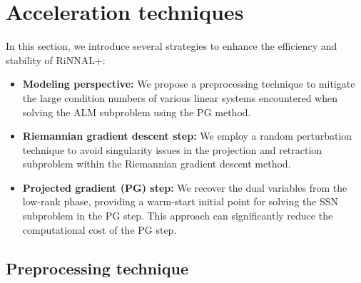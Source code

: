 \documentclass[11pt]{article}
\theoremstyle{plain}
\begin{document}

\section{Acceleration techniques}\label{sec-acceleration}

In this section, we introduce several strategies to enhance the efficiency and stability of RiNNAL+:
\begin{itemize}
    \item \textbf{Modeling perspective:} We propose a preprocessing technique to mitigate the large condition numbers of various linear systems encountered when solving the ALM subproblem using the PG method.
    \item \textbf{Riemannian gradient descent step:} We employ a random perturbation technique to avoid singularity issues in the projection and retraction subproblem within the Riemannian gradient descent method.
    
    \item \textbf{Projected gradient (PG) step:} We recover the dual variables from the low-rank phase, providing a warm-start initial point for solving the SSN subproblem in the PG step. This approach can significantly reduce the computational cost of the PG step.
\end{itemize}


\subsection{Preprocessing technique}\label{subsec-preprocess}
\end{document}
